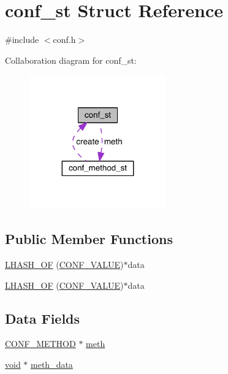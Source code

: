 \hypertarget{structconf__st}{}\section{conf\+\_\+st Struct Reference}
\label{structconf__st}


{\ttfamily \#include $<$conf.\+h$>$}



Collaboration diagram for conf\+\_\+st\+:\nopagebreak
\begin{figure}[H]
\begin{center}
\leavevmode
\includegraphics[width=167pt]{structconf__st__coll__graph}
\end{center}
\end{figure}
\subsection*{Public Member Functions}
\begin{DoxyCompactItemize}
\item 
\hyperlink{structconf__st_ac96d3fea778a777a38e8befd5155c089}{L\+H\+A\+S\+H\+\_\+\+OF} (\hyperlink{struct_c_o_n_f___v_a_l_u_e}{C\+O\+N\+F\+\_\+\+V\+A\+L\+UE})$\ast$data
\item 
\hyperlink{structconf__st_ac96d3fea778a777a38e8befd5155c089}{L\+H\+A\+S\+H\+\_\+\+OF} (\hyperlink{struct_c_o_n_f___v_a_l_u_e}{C\+O\+N\+F\+\_\+\+V\+A\+L\+UE})$\ast$data
\end{DoxyCompactItemize}
\subsection*{Data Fields}
\begin{DoxyCompactItemize}
\item 
\hyperlink{crypto_2conf_2conf_8h_a8e1c42b09eb2fde768c3a90e8338a6ea}{C\+O\+N\+F\+\_\+\+M\+E\+T\+H\+OD} $\ast$ \hyperlink{structconf__st_a4244cbf93eda670a1fb2e964e2b9dcfb}{meth}
\item 
\hyperlink{hw__4758__cca_8h_afad4d591c7931ff6dc5bf69c76c96aa0}{void} $\ast$ \hyperlink{structconf__st_abb3014ed4d11f8b0d1e88bc8ba42fd83}{meth\+\_\+data}
\end{DoxyCompactItemize}


